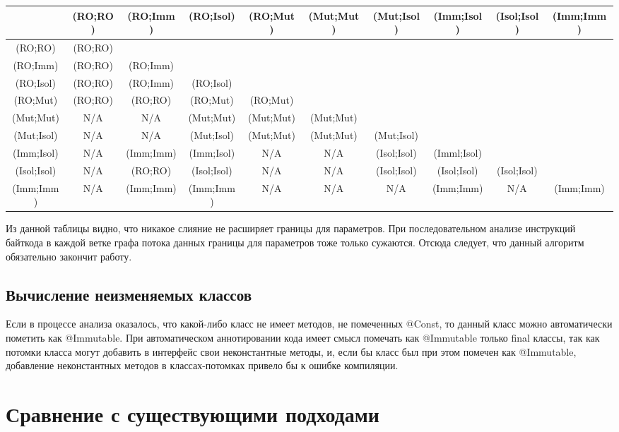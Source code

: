 {\tiny

	\begin{tabular}{| c | c | c | c | c | c | c | c | c | c |}
	\hline  &(RO;RO)&(RO;Imm)&(RO;Isol)&(RO;Mut)&(Mut;Mut)&(Mut;Isol)&(Imm;Isol)&(Isol;Isol)&(Imm;Imm)\\
	\hline(RO;RO)&(RO;RO)& & & & & & & & \\
	\hline(RO;Imm)&(RO;RO)&(RO;Imm) & & & & & & & \\
	\hline(RO;Isol)&(RO;RO)&(RO;Imm)&(RO;Isol)& & & & & & \\
	\hline(RO;Mut)&(RO;RO)&(RO;RO)&(RO;Mut)&(RO;Mut) & & & & & \\
	\hline(Mut;Mut)&N/A&N/A&(Mut;Mut)&(Mut;Mut)&(Mut;Mut) & & & & \\
	\hline(Mut;Isol)&N/A&N/A&(Mut;Isol)&(Mut;Mut)&(Mut;Mut)&(Mut;Isol)& & & \\
	\hline(Imm;Isol)&N/A&(Imm;Imm)&(Imm;Isol)&N/A&N/A&(Isol;Isol)&(Imml;Isol)& & \\
	\hline(Isol;Isol)&N/A&(RO;RO)&(Isol;Isol)&N/A&N/A&(Isol;Isol)&(Isol;Isol)&(Isol;Isol)&\\
	\hline(Imm;Imm)&N/A&(Imm;Imm)&(Imm;Imm)&N/A&N/A&N/A&(Imm;Imm)&N/A&(Imm;Imm)\\    
	\hline
    \end{tabular}

}

Из данной таблицы видно, что никакое слияние не расширяет границы для параметров. При последовательном анализе инструкций байткода в каждой ветке графа потока данных границы для параметров тоже только сужаются. Отсюда следует, что данный алгоритм обязательно закончит работу.

\subsection{Вычисление неизменяемых классов}

Если в процессе анализа оказалось, что какой-либо класс не имеет методов, не помеченных @Const, то данный класс можно автоматически пометить как @Immutable. При автоматическом аннотировании кода имеет смысл помечать как @Immutable только final классы, так как потомки класса могут добавить в интерфейс свои неконстантные методы, и, если бы класс был при этом помечен как @Immutable, добавление неконстантных методов в классах-потомках привело бы к ошибке компиляции.

\section{Сравнение с существующими подходами}

